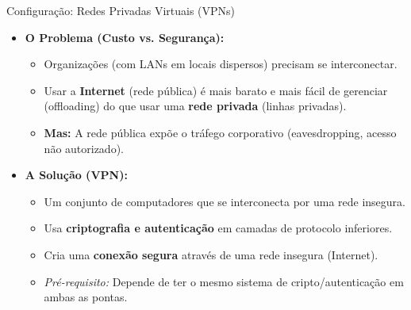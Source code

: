 \begin{frame}{Configuração: Redes Privadas Virtuais (VPNs)}
    \begin{itemize}
        \item \textbf{O Problema (Custo vs. Segurança):}
              \begin{itemize}
                  \item Organizações (com LANs em locais dispersos) precisam se interconectar.
                  \item Usar a \textbf{Internet} (rede pública) é mais barato e mais fácil de gerenciar (offloading) do que usar uma \textbf{rede privada} (linhas privadas).
                  \item \textbf{Mas:} A rede pública expõe o tráfego corporativo (eavesdropping, acesso não autorizado).
              \end{itemize}

        \item \textbf{A Solução (VPN):}
              \begin{itemize}
                  \item Um conjunto de computadores que se interconecta por uma rede insegura.
                  \item Usa \textbf{criptografia e autenticação} em camadas de protocolo inferiores.
                  \item Cria uma \textbf{conexão segura} através de uma rede insegura (Internet).
                  \item \textit{Pré-requisito:} Depende de ter o mesmo sistema de cripto/autenticação em ambas as pontas.
              \end{itemize}
    \end{itemize}
\end{frame}

